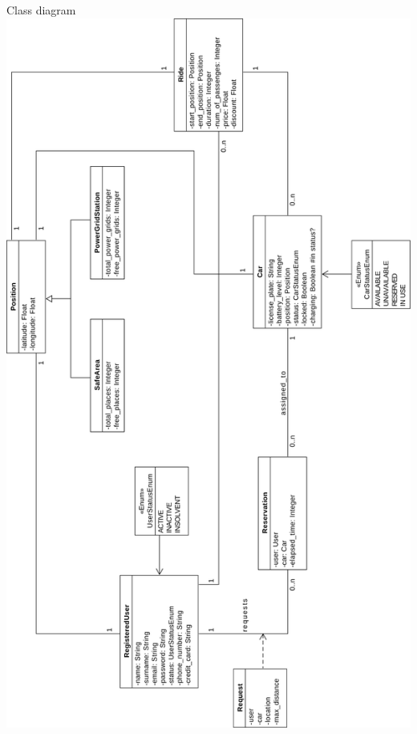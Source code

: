 \documentclass{beamer}
\begin{document}
	\begin{frame}{Class diagram}
		\includegraphics[height=\textwidth, angle=270]{figures/classdiagram.pdf}		
	\end{frame}
\end{document}
